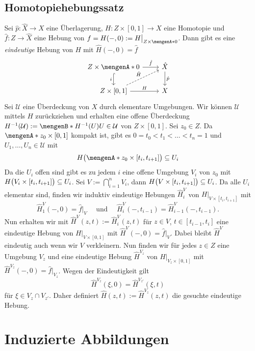 \subsection{Homotopiehebungssatz} %
\label{sub:108}
Sei $\hat{p} : \hat{X} \to X$ eine Überlagerung, $H : Z \times [0,1] \to X$ eine Homotopie und $\hat{f} : Z \to \hat{X}$ eine Hebung von 
$f = H(-,0) := H\big|_{Z \times \set{0}}$. Dann gibt es eine \emph{eindeutige} Hebung von $H$ mit $\hat{H}(-,0)= \hat{f}$
\[
	\begin{tikzcd}
		Z \times \set{0} \dar[hook, swap]{i} \rar{\hat{f}}& \hat{X} \dar{\hat{p}} \\
		Z \times [0,1] \urar[dashed]{\hat{H}} \rar{H}& X  
	\end{tikzcd}
\]
Sei $\mathcal{U}$ eine Überdeckung von $X$ durch elementare Umgebungen. Wir können $\mathcal{U}$ mittels $H$ zurückziehen und erhalten eine offene Überdeckung
$H ^{-1}(\mathcal{U}) := \set[H ^{-1}(U)]{U \in \mathcal{U}}$ von $Z \times [0,1]$. Sei $z_0 \in Z$. Da $\set{z_0} \times [0,1]$ kompakt ist, gibt es 
$0 = t_0 < t_1 < \ldots < t_n=1$ und $U_1, \ldots , U_n \in \mathcal{U}$ mit 
\[
	H \enbrace[\big]{\set{z_0} \times [t_i, t_{i+1}] } \subseteq U_i 
\]
Da die $U_i$ offen sind gibt es zu jedem $i$ eine offene Umgebung $V_i$ von $z_0$ mit $H\enbrace[\big]{V_i \times[t_i, t_{i+1}]} \subseteq U_i$. Sei 
$V := \bigcap_{i=1}^n V_i$, dann $H \enbrace[\big]{V \times [t_i, t_{i+1}]} \subseteq U_i$. Da alle $U_i$ elementar sind, finden wir induktiv eindeutige Hebungen
$\hat{H}_i^V$ von $H\big|_{V \times [t_i, t_{i+1}]}$ mit 
\[
	\hat{H}_1^V(-,0)= \hat{f}\big|_{V}\quad \text{ und } \quad \hat{H}_i^V(-,t_{i-1}) = \hat{H}_{i-1}^V (-, t_{i-1}).
\]
Nun erhalten wir mit $\hat{H}^V(z,t) := \hat{H}_i^V(z,t)$ für $z \in V$, $t \in [t_{i-1},t_i]$ eine eindeutige Hebung von $H\big|_{V \times [0,1]}$ mit 
$\hat{H}^V(-,0) = \hat{f}\big|_V$. Dabei bleibt $\hat{H}^V$ eindeutig auch wenn wir $V$ verkleinern. Nun finden wir für jedes $z \in Z$ eine Umgebung $V_z$ und eine 
eindeutige Hebung $\hat{H}^{V_z}$ von $H\big|_{V_z \times [0,1]}$ mit 
\(
	\hat{H}^{V_z} (-,0) = \hat{f}\big|_{V_z}
\).
Wegen der Eindeutigkeit gilt 
\[
	\hat{H}^{V_z} (\xi,0) = \hat{H}^{V_{z'}}(\xi,t)
\]
für $\xi \in V_z \cap V_{z'}$. Daher definiert $\hat{H}(z,t) := \hat{H}^{V_z}(z,t)$ die gesuchte eindeutige Hebung. \bewende
\newpage

\section{Induzierte Abbildungen} %
\label{sec:11}
